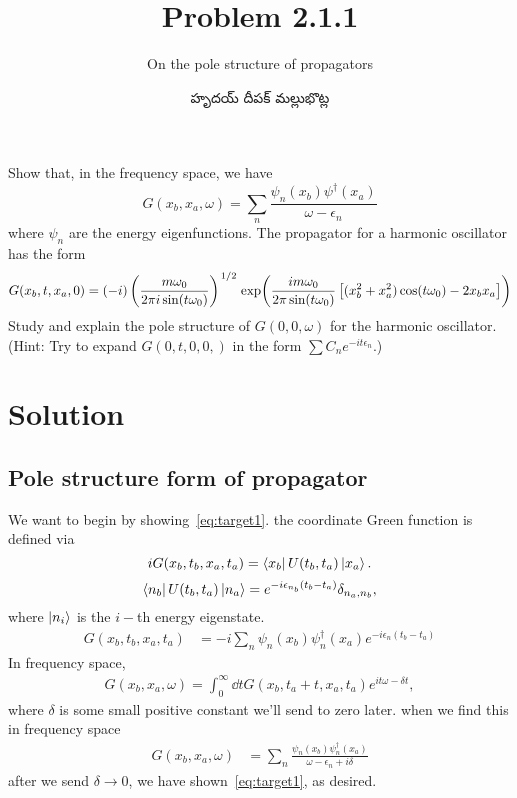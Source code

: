 \documentclass{article}
\title{Problem 2.1.1}
\subtitle{On the pole structure of propagators}
\author{\begin{telugu}హృదయ్ దీపక్ మల్లుభొట్ల\end{telugu}}
\begin{document}
	\maketitle
	Show that, in the frequency space, we have
	\begin{equation}
		G(x_b, x_a, \omega) = \sum_n \frac{\psi_n(x_b) \psi^\dagger(x_a)}{\omega - \epsilon_n} \label{eq:target1}
	\end{equation}
	where $\psi_n$ are the energy eigenfunctions.
	The propagator for a harmonic oscillator has the form
	\begin{equation}
		G(x_b, t, x_a, 0) = (-i) \left( \frac{m \omega_0}{2 \pi i \sin(t \omega_0)} \right)^{\flatfrac12} \exp(\frac{i m \omega_0}{2 \pi \sin(t\omega_0)}\left[(x_b^2 + x_a^2)\cos(t \omega_0) - 2 x_b x_a \right]) \label{eq:harmonicoscprop}
	\end{equation}
	Study and explain the pole structure of $G(0, 0, \omega)$ for the harmonic oscillator.
	(Hint: Try to expand $G(0, t, 0, 0,)$ in the form $\sum C_n e^{-i t \epsilon_n}$.)

	\section{Solution} \label{sec:solution}
	\subsection{Pole structure form of propagator} \label{subsec:sol1}
	We want to begin by showing~\eqref{eq:target1}.
	\triv the coordinate Green function is defined via
	\begin{equation}
		i G(x_b, t_b, x_a, t_a) = \bra{x_b} U(t_b, t_a) \ket{x_a}.
	\end{equation}
	\triv
	\begin{equation}
		\bra{n_b} U(t_b, t_a) \ket{n_a} = e^{-i \epsilon_{n_b} (t_b - t_a)} \delta_{n_a, n_b},
	\end{equation}
	where $\ket{n_i}$ is the $i-$th energy eigenstate.
	\thrf
	\begin{align}
		G(x_b, t_b, x_a, t_a) &= -i \sum_{n} \psi_n(x_b) \psi_n^\dagger(x_a)  e^{-i \epsilon_{n} (t_b - t_a)}
	\end{align}
	In frequency space,
	\begin{align}
		G(x_b, x_a, \omega) = \int_0^\infty \dd{t} G(x_b, t_a + t, x_a, t_a) e^{i t \omega - \delta t},
	\end{align}
	where $\delta$ is some small positive constant we'll send to zero later.
	\triv when we find this in frequency space
	\begin{align}
		G(x_b, x_a, \omega) &= \sum_{n} \frac{\psi_n(x_b) \psi_n^\dagger(x_a)}{\omega - \epsilon_n + i \delta}
	\end{align}
	\thrf after we send $\delta \rightarrow 0$, we have shown~\eqref{eq:target1}, as desired.
\end{document}
